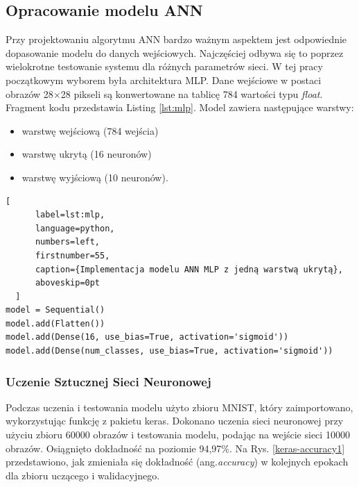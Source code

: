 \subsection{Opracowanie modelu ANN}

Przy projektowaniu algorytmu ANN bardzo ważnym aspektem jest odpowiednie dopasowanie modelu do danych wejściowych. 
Najczęściej odbywa się to poprzez wielokrotne testowanie systemu dla różnych parametrów sieci. W tej pracy początkowym 
wyborem była architektura MLP. Dane wejściowe w postaci obrazów 28$\times$28 pikseli są konwertowane na tablicę 784 wartości 
typu \emph{float}. Fragment kodu przedstawia Listing \ref{lst:mlp}. Model zawiera następujące warstwy:
\begin{itemize}
  \item warstwę wejściową (784 wejścia)
  \item warstwę ukrytą (16 neuronów)
  \item warstwę wyjściową (10 neuronów).
\end{itemize}

\begin{addmargin}[10mm]{0mm}
  \begin{lstlisting}[
      label=lst:mlp,
      language=python,
      numbers=left,
      firstnumber=55,
      caption={Implementacja modelu ANN MLP z jedną warstwą ukrytą},
      aboveskip=0pt
  ]
model = Sequential()
model.add(Flatten())
model.add(Dense(16, use_bias=True, activation='sigmoid'))
model.add(Dense(num_classes, use_bias=True, activation='sigmoid'))

  \end{lstlisting}
  \end{addmargin}

\subsubsection{Uczenie Sztucznej Sieci Neuronowej}
Podczas uczenia i testowania modelu użyto zbioru MNIST, który zaimportowano, wykorzystując
funkcję z pakietu keras. Dokonano uczenia sieci neuronowej przy użyciu zbioru 60000 
obrazów i testowania modelu, podając na wejście sieci 10000 obrazów. Osiągnięto 
dokładność na poziomie 94,97\%. Na Rys. \ref{keras-accuracy1} przedstawiono, jak zmieniała się dokładność (ang.\emph{accuracy}) w kolejnych epokach dla zbioru uczącego i walidacyjnego.

